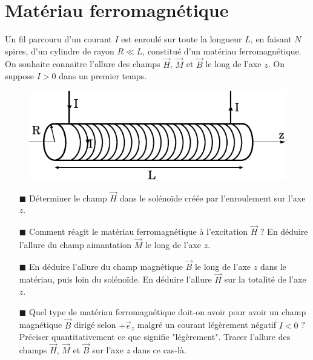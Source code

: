 \documentclass{report}
\begin{document}
\newpage

\section*{Matériau ferromagnétique}

Un fil parcouru d'un courant $I$ est enroulé sur toute la longueur $L$, en faisant $N$ spires, d'un cylindre de rayon $R\ll L$, constitué d'un matériau ferromagnétique. On souhaite connaitre l'allure des champs $\vec{H}$, $\vec{M}$ et $\vec{B}$ le long de l'axe $z$. On suppose $I>0$ dans un premier temps.
	
		\begin{figure}[h!]
	\centering
		\includegraphics[scale=0.9]{ferro.pdf}
	\end{figure}	
	
\begin{itemize}

	\item[$\blacksquare$] Déterminer le champ $\vec{H}$ dans le solénoïde créée par l'enroulement sur l'axe $z$. 
	
	\item[$\blacksquare$] Comment réagit le matériau ferromagnétique à l'excitation $\vec{H}$ ? En déduire l'allure du champ aimantation $\vec{M}$ le long de l'axe $z$. 
	
	\item[$\blacksquare$] En déduire l'allure du champ magnétique $\vec{B}$ le long de l'axe $z$ dans le matériau, puis loin du solénoïde. En déduire l'allure $\vec{H}$ sur la totalité de l'axe $z$.
	
	\item[$\blacksquare$] Quel type de matériau ferromagnétique doit-on avoir pour avoir un champ magnétique $\vec{B}$ dirigé selon $+\vec{e}_z$ malgré un courant légèrement négatif $I<0$ ? Préciser quantitativement ce que signifie "légèrement". Tracer l'allure des champs $\vec{H}$, $\vec{M}$ et $\vec{B}$ sur l'axe $z$ dans ce cas-là.

\end{itemize}
\end{document}

